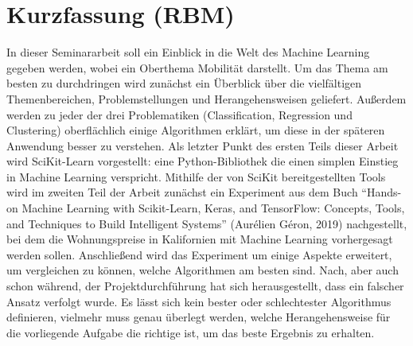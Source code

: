 \section*{Kurzfassung (RBM)}
In dieser Seminararbeit soll ein Einblick in die Welt des Machine Learning gegeben werden, wobei ein Oberthema Mobilität darstellt. 
Um das Thema am besten zu durchdringen wird zunächst ein Überblick über die vielfältigen Themenbereichen, Problemstellungen und Herangehensweisen geliefert. Außerdem werden zu jeder der drei Problematiken (Classification, Regression und Clustering) oberflächlich einige Algorithmen erklärt, um diese in der späteren Anwendung besser zu verstehen.
Als letzter Punkt des ersten Teils dieser Arbeit wird SciKit-Learn vorgestellt: eine Python-Bibliothek die einen simplen Einstieg in Machine Learning verspricht.
Mithilfe der von SciKit bereitgestellten Tools wird im zweiten Teil der Arbeit zunächst ein Experiment aus dem Buch “Hands-on Machine Learning with Scikit-Learn, Keras, and TensorFlow: Concepts, Tools, and Techniques to Build Intelligent Systems” (Aurélien Géron, 2019) nachgestellt, bei dem die Wohnungspreise in Kalifornien mit Machine Learning vorhergesagt werden sollen. Anschließend wird das Experiment um einige Aspekte erweitert, um vergleichen zu können, welche Algorithmen am besten sind. 
Nach, aber auch schon während, der Projektdurchführung hat sich herausgestellt, dass ein falscher Ansatz verfolgt wurde. Es lässt sich kein bester oder schlechtester Algorithmus definieren, vielmehr muss genau überlegt werden, welche Herangehensweise für die vorliegende Aufgabe die richtige ist, um das beste Ergebnis zu erhalten.

\vfill\vfill\vfill\vfill\vfill\vfill
